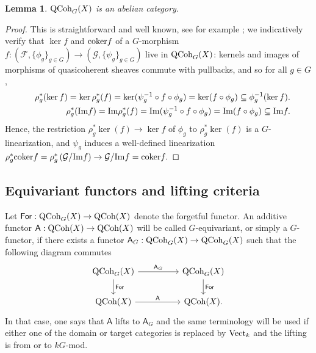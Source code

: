\documentclass[10pt]{amsart}
\newtheorem{lemma}[theorem]{Lemma}
\theoremstyle{definition}
\begin{document}
\begin{lemma}\label{lem:abcat}
${\rm QCoh}_G(X)$ is an abelian category.
\end{lemma}
\begin{proof}
This is straightforward and well known, see for example \cite[1.4]{MR921490}; we indicatively verify that $\ker f$ and ${\rm coker }f$ of a $G$-morphism $f:(\mathcal{F},\{\phi_g\}_{g\in G})\rightarrow(\mathcal{G},\{\psi_g\}_{g\in G})$ live in ${\rm QCoh}_G(X)$: kernels and images of morphisms of quasicoherent sheaves commute with pullbacks, and so for all $g\in G$,
\begin{eqnarray*}
&&\rho_g^*(\ker f)=\ker\rho_g^*(f)=\ker(\psi_g^{-1}\circ f\circ\phi_g)=\ker(f\circ\phi_g)\subseteq\phi_g^{-1}(\ker f).\\
&&\rho_g^*({\rm Im }f)={\rm Im}\rho_g^*(f)={\rm Im}(\psi_g^{-1}\circ f\circ\phi_g)={\rm Im}(f\circ\phi_g)\subseteq{\rm Im} f.
\end{eqnarray*}
Hence, the restriction $\rho_g^*\ker(f)\rightarrow\ker f$ of $\phi_g$ to $\rho_g^*\ker(f)$ is a $G$-linearization, and $\psi_g$ induces a well-defined linearization
$
\rho^*_g{\rm coker}f=\rho^*_g\left(\mathcal{G}/{\rm Im}f\right)\rightarrow \mathcal{G}/{\rm Im}f={\rm coker}f.
$
\end{proof}

\subsection{Equivariant functors and lifting criteria}
Let $\mathsf{For}:{\rm QCoh}_G(X)\rightarrow {\rm QCoh}(X)$ denote the forgetful functor. An additive functor $\mathsf{A}:{\rm QCoh}(X)\rightarrow {\rm QCoh}(X)$ will be called $G$-equivariant, or simply a $G$-functor, if there exists a functor $\mathsf{A}_G:{\rm QCoh}_G(X)\rightarrow {\rm QCoh}_G(X)$ such that the following diagram commutes
\[
\begin{tikzcd}[column sep=huge]
{\rm QCoh}_G(X) \arrow[r, "\mathsf{A}_G"] \arrow[d, "\mathsf{For}"] &{\rm QCoh}_G(X)\arrow[d, "\mathsf{For}"] \\
{\rm QCoh}(X) \arrow[r, "\mathsf{A}"] &{\rm QCoh}(X).
\end{tikzcd}
\]
In that case, one says that $\mathsf{A}$ lifts to $\mathsf{A}_G$ and the same terminology will be used if either one of the domain or target categories is replaced by ${\rm Vect}_k$ and the lifting is from or to $kG$-mod.
\end{document}

